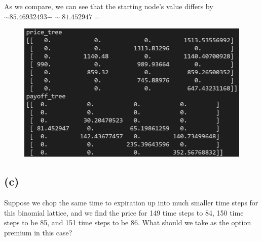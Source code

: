\documentclass{article}
\begin{document}
{As we compare, we can see that the starting node's value differs by $\sim 85.46932493 - \sim 81.452947 = $ 

\begin{figure}[h]
  \centering
  \includegraphics[width=120mm]{./2b.png}
\end{figure}

\subsection*{(c)}

Suppose we chop the same time to expiration up into much smaller time steps for this binomial lattice, and we find the price for 149 time steps to 84, 150 time steps to be 85, and 151 time steps to be 86. What should we take as the option premium in this case?



\newpage
}
\end{document}
